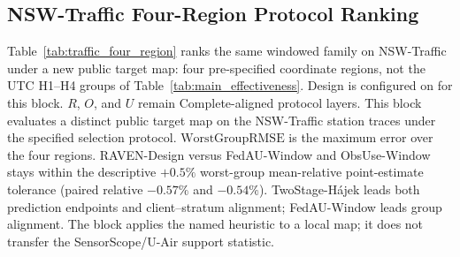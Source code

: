 \subsection{NSW-Traffic Four-Region Protocol Ranking}

Table~\ref{tab:traffic_four_region} ranks the same windowed family on
NSW-Traffic under a new public target map: four pre-specified coordinate
regions, not the UTC H1--H4 groups of Table~\ref{tab:main_effectiveness}.
Design is configured on for this block.
$R$, $O$, and $U$ remain Complete-aligned protocol layers.
This block evaluates a distinct public target map on the NSW-Traffic station
traces under the specified selection protocol.
$\mathrm{WorstGroupRMSE}$ is the maximum error over the four regions.
RAVEN-Design versus FedAU-Window and ObsUse-Window stays within
the descriptive $+0.5\%$ worst-group mean-relative point-estimate
tolerance (paired relative $-0.57\%$ and $-0.54\%$).
TwoStage-H\'ajek leads both prediction endpoints and client--stratum alignment;
FedAU-Window leads group alignment.
The block applies the named heuristic to a local map; it does not transfer
the SensorScope/U-Air support statistic.

